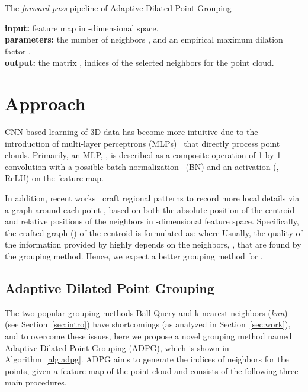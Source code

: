 \documentclass[10pt,twocolumn,letterpaper]{article}
\begin{document}
\begin{algorithm}\caption{The \emph{forward pass} pipeline of\newline
    \hspace{\linewidth} Adaptive Dilated Point Grouping}\label{alg:adpg}
\textbf{input:} feature map  in -dimensional space.\\
\textbf{parameters:} the number of neighbors , and an empirical maximum dilation factor .\\
\textbf{output:} the matrix , indices of the selected  neighbors for the point cloud.\\
\end{algorithm}
\section{Approach}
CNN-based learning of 3D data has become more intuitive due to the introduction of multi-layer perceptrons (MLPs)~\cite{qi2017pointnet} that directly process point clouds. Primarily, an MLP, , is described as a composite operation of 1-by-1 convolution with a possible batch normalization~\cite{ioffe2015batch} (BN) and an activation (\eg, ReLU) on the feature map.

In addition, recent works~\cite{wang2019dynamic, engelmann2019dilated, yan2020pointasnl} craft regional patterns to record more local details via a graph around each point , based on both the absolute position of the centroid and relative positions of the neighbors in -dimensional feature space. Specifically, the crafted graph () of the centroid  is formulated as:  where  Usually, the quality of the information provided by  highly depends on the neighbors, , that are found by the grouping method.  Hence, we expect a better grouping method for .

\subsection{Adaptive Dilated Point Grouping}
\label{sec:adpg}
The two popular grouping methods \ie Ball Query and k-nearest neighbors (\emph{knn}) (see Section~\ref{sec:intro}) have shortcomings (as analyzed in Section~\ref{sec:work}), and to overcome these issues, here we propose a novel grouping method named Adaptive Dilated Point Grouping (ADPG), which is shown in Algorithm~\ref{alg:adpg}. ADPG aims to generate the indices of neighbors  for the points, given a feature map  of the point cloud and consists of the following three main procedures.
\end{document}
